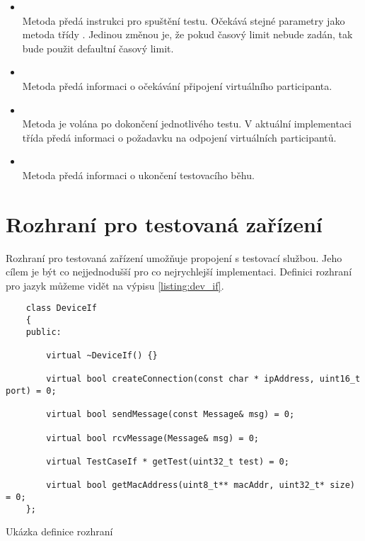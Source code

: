 \begin{itemize}
    \item {} \\ Metoda předá instrukci pro spuštění testu. Očekává stejné parametry jako metoda  třídy . Jedinou změnou je, že pokud časový limit nebude zadán, tak bude použit defaultní časový limit.
    \item {} \\ Metoda předá informaci o očekávání připojení virtuálního participanta.
    \item {} \\ Metoda je volána po dokončení jednotlivého testu. V aktuální implementaci třída předá informaci o požadavku na odpojení virtuálních participantů.
    \item {} \\ Metoda předá informaci o ukončení testovacího běhu.
\end{itemize}


\section{Rozhraní pro testovaná zařízení}

Rozhraní pro testovaná zařízení umožňuje propojení s testovací službou. Jeho cílem je být co nejjednodušší pro co nejrychlejší implementaci. Definici rozhraní pro jazyk  můžeme vidět na výpisu \ref{listing:dev_if}.

\begin{listing}[htbp]
    \begin{verbatim}
    class DeviceIf
    {
    public:

        virtual ~DeviceIf() {}

        virtual bool createConnection(const char * ipAddress, uint16_t port) = 0;

        virtual bool sendMessage(const Message& msg) = 0;

        virtual bool rcvMessage(Message& msg) = 0;

        virtual TestCaseIf * getTest(uint32_t test) = 0;

        virtual bool getMacAddress(uint8_t** macAddr, uint32_t* size) = 0;
    };
    \end{verbatim}
\caption{Ukázka definice rozhraní}
\label{listing:dev_if}
\end{listing}

